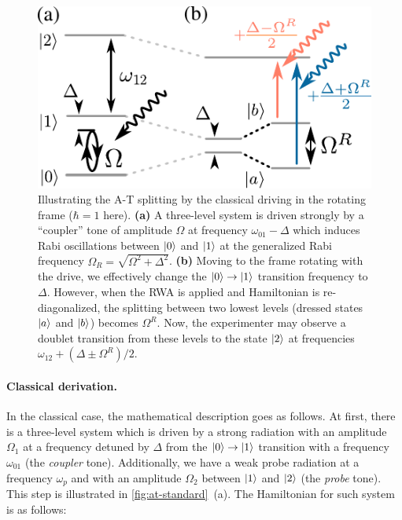 \documentclass[%
 prx,
 amsmath,amssymb,
 reprint,%
]{revtex4-1}
\begin{document}
\begin{figure}[b]	
	\includegraphics[width=\linewidth]{intro_scheme}
	\caption{Illustrating the A-T splitting by  the classical driving in the rotating frame ($\hbar=1$ here). \textbf{(a)} A three-level system is driven strongly by a ``coupler'' tone of amplitude $\Omega$ at frequency $\omega_{01}-\Delta$ which induces Rabi oscillations between $\ket{0}$ and $\ket{1}$ at the generalized Rabi frequency $\Omega_R = \sqrt{\Omega^2 + \Delta^2}$. \textbf{(b)} Moving to the frame rotating with the drive, we effectively change the $\ket{0}\rightarrow \ket{1}$ transition frequency to $\Delta$. However, when the RWA is applied and Hamiltonian is re-diagonalized, the splitting between two lowest levels (dressed states $\ket{a}$ and $\ket{b}$) becomes $\Omega^R$. Now, the experimenter may observe a doublet transition from these levels to the state $\ket{2}$ at frequencies $\omega_{12}+(\Delta \pm \Omega^R)/2$.} 
	\label{fig:at-standard}
\end{figure}

\paragraph{Classical derivation.} In the classical case, the mathematical description goes as follows. At first, there is a three-level system which is driven by a strong radiation with an amplitude $\Omega_1$ at a frequency detuned by $\Delta$ from the $\ket{0}\rightarrow \ket{1}$ transition with a frequency $\omega_{01}$ (the \textit{coupler} tone). Additionally, we have a weak probe radiation at a frequency $\omega_{p}$ and with an amplitude $\Omega_2$ between $\ket{1}$ and $\ket{2}$ (the \textit{probe} tone). This step is illustrated in \autoref{fig:at-standard}~(a). The Hamiltonian for such system is as follows:
\end{document}
